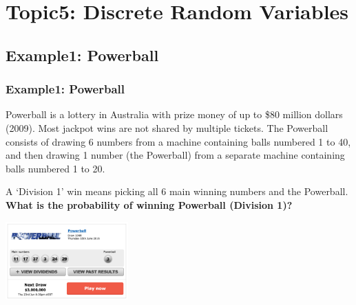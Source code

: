 \documentclass[t,xcolor=pdftex,dvipsnames,table]{beamer}\usepackage[]{graphicx}\usepackage[]{color}
\begin{document}
\section[5]{Topic5: Discrete Random Variables}

\subsection{Example1: Powerball}
\begin{frame}\frametitle{Example1: Powerball}

Powerball is a lottery in Australia with prize money of up to   \$80 million dollars (2009). Most jackpot wins are not shared by multiple tickets. The Powerball consists of drawing 6 numbers from a machine containing balls numbered 1 to 40, and then drawing 1 number (the Powerball) from a separate machine containing balls numbered 1 to 20.

\vspace{.5cm}
A `Division 1' win means picking all 6 main winning numbers and the Powerball.
{\bf What is the probability of winning Powerball (Division 1)?}

\begin{center}
\includegraphics[height=3cm]{../images/Powerball.jpg}
\end{center}
\href{https://tatts.com/goldencasket/games/powerball/how-to-play}{}

\end{frame}
\end{document}
